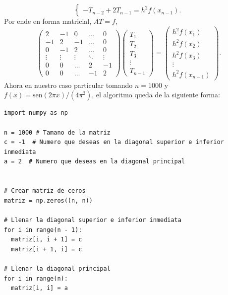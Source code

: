 \begin{homeworkProblem}
\begin{solucion}
\begin{enumerate}[a)]
\[\begin{cases}
              -T_{n-2} + 2T_{n-1} = h^2 f(x_{n-1}).
            \end{cases}
          \]
          Por ende en forma matricial, $AT=f$,
          \[
            \begin{pmatrix}
              2 & -1 & 0 & \dots & 0 \\
              -1 & 2 & -1 & \dots & 0 \\
              0 & -1 & 2 & \dots & 0 \\
              \vdots & \vdots & \vdots & \ddots & \vdots \\
              0 & 0 & \dots & 2 & -1\\
              0 & 0 & \dots & -1 & 2
              \end{pmatrix}
              \begin{pmatrix}
              T_1 \\
              T_2 \\
              T_3 \\
              \vdots \\
              T_{n-1}
              \end{pmatrix}
              =
              \begin{pmatrix}
              h^2 f(x_1) \\
              h^2 f(x_2) \\
              h^2 f(x_3) \\
              \vdots \\
              h^2 f(x_{n-1})
            \end{pmatrix}.
          \]
          Ahora en nuestro caso particular tomando $n=1000$ y $f(x)=\text{sen}(2\pi x)/(4\pi^2)$, el algoritmo queda de la siguiente forma:
          \begin{lstlisting}
import numpy as np
            
n = 1000 # Tamano de la matriz
c = -1  # Numero que deseas en la diagonal superior e inferior inmediata
a = 2  # Numero que deseas en la diagonal principal
            
            
# Crear matriz de ceros
matriz = np.zeros((n, n))
            
# Llenar la diagonal superior e inferior inmediata
for i in range(n - 1):
  matriz[i, i + 1] = c
  matriz[i + 1, i] = c
            
# Llenar la diagonal principal
for i in range(n):
  matriz[i, i] = a
            

\end{lstlisting}
\end{enumerate}
\end{solucion}
\end{homeworkProblem}
